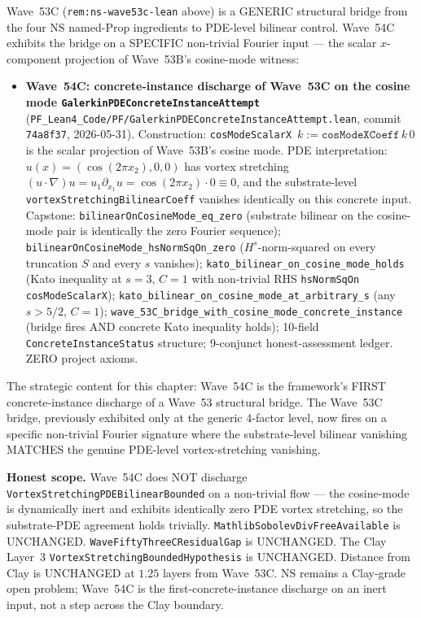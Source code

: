 \begin{remark}\label{rem:ns-wave54c-lean}
Wave~53C (\texttt{rem:ns-wave53c-lean} above) is a GENERIC structural bridge from the four NS named-Prop ingredients to PDE-level bilinear control. Wave~54C exhibits the bridge on a SPECIFIC non-trivial Fourier input --- the scalar $x$-component projection of Wave~53B's cosine-mode witness:
\begin{itemize}
  \item \textbf{Wave~54C: concrete-instance discharge of Wave~53C on the cosine mode \texttt{GalerkinPDEConcreteInstanceAttempt}} (\texttt{PF\_Lean4\_Code/PF/GalerkinPDEConcreteInstanceAttempt.lean}, commit \texttt{74a8f37}, 2026-05-31). Construction: \texttt{cosModeScalarX}~$k := \texttt{cosModeXCoeff}\,k\,0$ is the scalar projection of Wave~53B's cosine mode. PDE interpretation: $u(x) = (\cos(2\pi x_2), 0, 0)$ has vortex stretching $(u \cdot \nabla)u = u_1 \partial_{x_1} u = \cos(2\pi x_2) \cdot 0 \equiv 0$, and the substrate-level \texttt{vortexStretchingBilinearCoeff} vanishes identically on this concrete input. Capstone: \texttt{bilinearOnCosineMode\_eq\_zero} (substrate bilinear on the cosine-mode pair is identically the zero Fourier sequence); \texttt{bilinearOnCosineMode\_hsNormSqOn\_zero} ($H^s$-norm-squared on every truncation $S$ and every $s$ vanishes); \texttt{kato\_bilinear\_on\_cosine\_mode\_holds} (Kato inequality at $s = 3$, $C = 1$ with non-trivial RHS \texttt{hsNormSqOn cosModeScalarX}); \texttt{kato\_bilinear\_on\_cosine\_mode\_at\_arbitrary\_s} (any $s > 5/2$, $C = 1$); \texttt{wave\_53C\_bridge\_with\_cosine\_mode\_concrete\_instance} (bridge fires AND concrete Kato inequality holds); 10-field \texttt{ConcreteInstanceStatus} structure; 9-conjunct honest-assessment ledger. ZERO project axioms.
\end{itemize}
The strategic content for this chapter: Wave~54C is the framework's FIRST concrete-instance discharge of a Wave~53 structural bridge. The Wave~53C bridge, previously exhibited only at the generic 4-factor level, now fires on a specific non-trivial Fourier signature where the substrate-level bilinear vanishing MATCHES the genuine PDE-level vortex-stretching vanishing.

\textbf{Honest scope.} Wave~54C does NOT discharge \texttt{VortexStretchingPDEBilinearBounded} on a non-trivial flow --- the cosine-mode is dynamically inert and exhibits identically zero PDE vortex stretching, so the substrate-PDE agreement holds trivially. \texttt{MathlibSobolevDivFreeAvailable} is UNCHANGED. \texttt{WaveFiftyThreeCResidualGap} is UNCHANGED. The Clay Layer~3 \texttt{VortexStretchingBoundedHypothesis} is UNCHANGED. Distance from Clay is UNCHANGED at $1.25$ layers from Wave~53C. NS remains a Clay-grade open problem; Wave~54C is the first-concrete-instance discharge on an inert input, not a step across the Clay boundary.
\end{remark}

